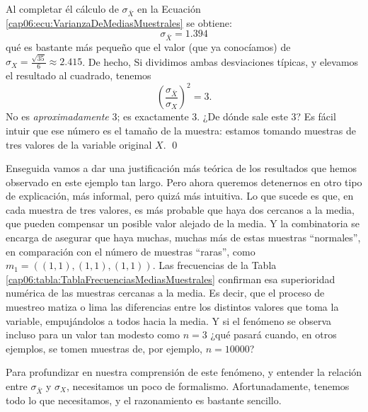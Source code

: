 \begin{ejemplo}
        Al completar él cálculo de $\sigma_{\bar X}$ en la Ecuación \ref{cap06:ecu:VarianzaDeMediasMuestrales} se obtiene:
        \[\sigma_{\bar X}=1.394\]
        qué es bastante más pequeño que el valor (que ya conocíamos) de $\sigma_X=\frac{\sqrt{35}}{6}\approx 2.415$. De hecho, Si dividimos ambas desviaciones típicas, y elevamos el resultado al cuadrado, tenemos
        \[\left(\dfrac{\sigma_{\bar X}}{\sigma_X}\right)^2=3.\]
        No es {\em aproximadamente} 3; es {\sf exactamente} $3$. ¿De dónde sale este $3$? Es fácil intuir que ese número es el tamaño de la muestra: estamos tomando muestras de tres valores de la variable original $X$. \qed

\end{ejemplo}

Enseguida vamos a dar una justificación más teórica de los resultados que hemos
observado en este ejemplo tan largo. Pero ahora queremos detenernos en otro
tipo de explicación, más informal, pero quizá más intuitiva. Lo que sucede es
que, en cada muestra de tres valores, es más probable que haya dos cercanos a
la media, que pueden compensar un posible valor alejado de la media. Y la
combinatoria se encarga de asegurar que haya muchas, muchas más de estas
muestras ``normales'', en comparación con el número de muestras ``raras'', como
$m_1=\left((1,1),(1,1),(1,1)\right)$. Las frecuencias de la Tabla
\ref{cap06:tabla:TablaFrecuenciasMediasMuestrales} confirman esa superioridad
numérica de las muestras cercanas a la media. Es decir, que el proceso de
muestreo matiza o lima las diferencias entre los distintos valores que toma la
variable, empujándolos a todos hacia la media. Y si el fenómeno se observa
incluso para un valor tan modesto como $n=3$ ¿qué pasará cuando, en otros
ejemplos, se tomen muestras de, por ejemplo, $n=10000$?

Para profundizar en nuestra comprensión de este fenómeno, y entender la
relación entre $\sigma_{\bar X}$ y $\sigma_X$, necesitamos un poco de
formalismo. Afortunadamente, tenemos todo lo que necesitamos, y el razonamiento
es bastante sencillo.

